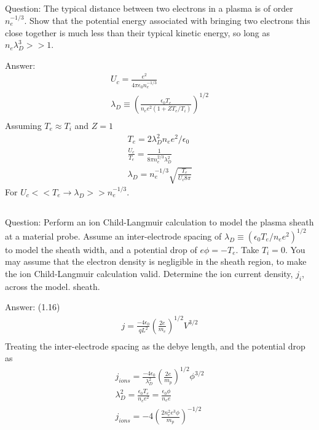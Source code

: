 \documentclass{article}
\begin{document}
\subsection{}
Question: The typical distance between two electrons in a plasma is of order $n_e^{-1/3}$. Show that the potential energy associated with bringing two electrons this close together is much less than their typical kinetic energy, so long as $n_e\lambda_D^3>>1$.

Answer: 
\begin{eqnarray*}
    U_c=\frac{e^2}{4\pi \epsilon_0 n_e^{-1/3}}\\
    \lambda_D \equiv (\frac{\epsilon_0 T_e}{n_ee^2(1+ZT_e/T_i)})^{1/2}\\
\end{eqnarray*}
Assuming $T_e\approx T_i$ and $Z=1$\\
\begin{eqnarray*}
    T_e=2\lambda_D^2 n_e e^2/\epsilon_0\\
    \frac{U_c}{T_e}=\frac{1}{8\pi n_e^{2/3}\lambda_D^2}\\
    \lambda_D=n_e^{-1/3}\sqrt{\frac{T_e}{U_c 8\pi}}
\end{eqnarray*}
For $U_c<< T_e \rightarrow \lambda_D>>n_e^{-1/3}$. 

\subsection{}
Question: Perform an ion Child-Langmuir calculation to model the plasma sheath at a material probe.
Assume an inter-electrode spacing of $\lambda_D\equiv (\epsilon_0T_e/n_ee^2)^{1/2}$ to model the sheath width, and a potential drop of $e\phi=-T_e$. 
Take $T_i=0$. You may assume that the electron density is negligible in the sheath region, to make the ion Child-Langmuir calculation valid.
Determine the ion current density, $j_i$, across the model. sheath.

Answer:
(1.16)
\begin{eqnarray*}
    j=\frac{-4\epsilon_0}{qL^2}(\frac{2e}{m_e})^{1/2}V^{3/2}\\
\end{eqnarray*}
Treating the inter-electrode spacing as the debye length, and the potential drop as 
\begin{eqnarray*}
    j_{ions}=\frac{-4\epsilon_0}{\lambda_D^2}(\frac{2e}{m_p})^{1/2}\phi^{3/2}\\
    \lambda_D^2=\frac{\epsilon_0T_e}{n_ee^2}=\frac{\epsilon_0\phi}{n_ee}\\
    j_{ions}=-4(\frac{2n_e^2e^3\phi}{m_p})^{-1/2}\\
\end{eqnarray*}
\end{document}
